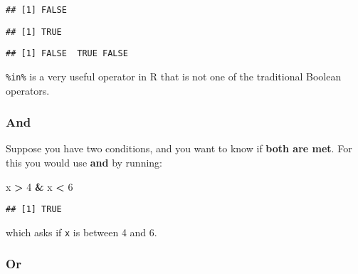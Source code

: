 \documentclass[]{book}
\newenvironment{Shaded}{\begin{snugshade}}{\end{snugshade}}
\newcommand{\KeywordTok}[1]{\textcolor[rgb]{0.13,0.29,0.53}{\textbf{#1}}}
\newcommand{\DecValTok}[1]{\textcolor[rgb]{0.00,0.00,0.81}{#1}}
\newcommand{\StringTok}[1]{\textcolor[rgb]{0.31,0.60,0.02}{#1}}
\newcommand{\CommentTok}[1]{\textcolor[rgb]{0.56,0.35,0.01}{\textit{#1}}}
\newcommand{\OperatorTok}[1]{\textcolor[rgb]{0.81,0.36,0.00}{\textbf{#1}}}
\newcommand{\NormalTok}[1]{#1}
\theoremstyle{definition}
\theoremstyle{definition}
\theoremstyle{definition}
\theoremstyle{remark}
\begin{document}
\begin{verbatim}
## [1] FALSE
\end{verbatim}

\begin{Shaded}
\end{Shaded}

\begin{verbatim}
## [1] TRUE
\end{verbatim}

\begin{Shaded}
\end{Shaded}

\begin{verbatim}
## [1] FALSE  TRUE FALSE
\end{verbatim}

\texttt{\%in\%} is a very useful operator in R that is not one of the
traditional Boolean operators.

\subsubsection*{And}\label{and}

Suppose you have two conditions, and you want to know if \textbf{both
are met}. For this you would use \textbf{and} by running:

\begin{Shaded}
\begin{Highlighting}[]
\NormalTok{x }\OperatorTok{>}\StringTok{ }\DecValTok{4} \OperatorTok{&}\StringTok{ }\NormalTok{x }\OperatorTok{<}\StringTok{ }\DecValTok{6}
\end{Highlighting}
\end{Shaded}

\begin{verbatim}
## [1] TRUE
\end{verbatim}

which asks if \texttt{x} is between 4 and 6.

\subsubsection*{Or}\label{or}
\end{document}
